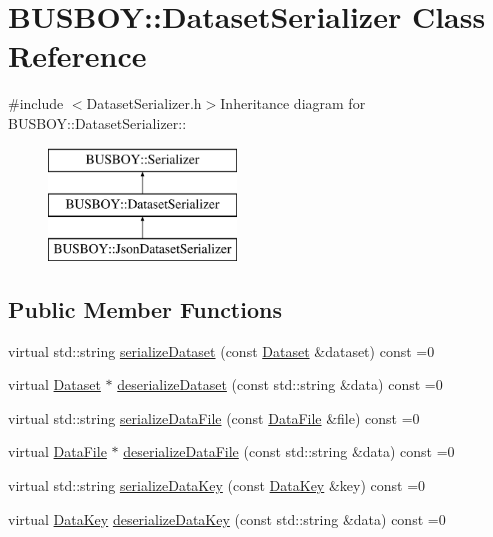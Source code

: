 \hypertarget{classBUSBOY_1_1DatasetSerializer}{
\section{BUSBOY::DatasetSerializer Class Reference}
\label{classBUSBOY_1_1DatasetSerializer}
}


{\ttfamily \#include $<$DatasetSerializer.h$>$}Inheritance diagram for BUSBOY::DatasetSerializer::\begin{figure}[H]
\begin{center}
\leavevmode
\includegraphics[height=3cm]{classBUSBOY_1_1DatasetSerializer}
\end{center}
\end{figure}
\subsection*{Public Member Functions}
\begin{DoxyCompactItemize}
\item 
virtual std::string \hyperlink{classBUSBOY_1_1DatasetSerializer_a1c949eb74f1b6277361237633c0f1343}{serializeDataset} (const \hyperlink{classBUSBOY_1_1Dataset}{Dataset} \&dataset) const =0
\item 
virtual \hyperlink{classBUSBOY_1_1Dataset}{Dataset} $\ast$ \hyperlink{classBUSBOY_1_1DatasetSerializer_a1afb118e410e71ebd7416aefd2aa7121}{deserializeDataset} (const std::string \&data) const =0
\item 
virtual std::string \hyperlink{classBUSBOY_1_1DatasetSerializer_ab9b56a991074a0abb0ab94d2a409c6bf}{serializeDataFile} (const \hyperlink{classBUSBOY_1_1DataFile}{DataFile} \&file) const =0
\item 
virtual \hyperlink{classBUSBOY_1_1DataFile}{DataFile} $\ast$ \hyperlink{classBUSBOY_1_1DatasetSerializer_a3937ed2b549641822c5b967f897525f0}{deserializeDataFile} (const std::string \&data) const =0
\item 
virtual std::string \hyperlink{classBUSBOY_1_1DatasetSerializer_ae6feb1fca82e563d82a07722b4cc1999}{serializeDataKey} (const \hyperlink{classBUSBOY_1_1DataKey}{DataKey} \&key) const =0
\item 
virtual \hyperlink{classBUSBOY_1_1DataKey}{DataKey} \hyperlink{classBUSBOY_1_1DatasetSerializer_a2bae57eabc95977f4c9679bb88289fa8}{deserializeDataKey} (const std::string \&data) const =0
\end{DoxyCompactItemize}


